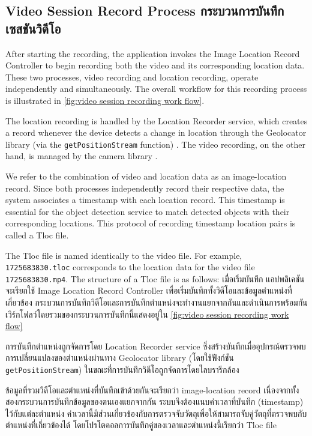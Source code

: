 \subsection{\ifenglish Video Session Record Process \else กระบวนการบันทึกเซสชันวิดีโอ \fi}

\ifenglish
After starting the recording, the application invokes the Image Location Record Controller to begin recording both the video and its corresponding location data. These two processes, video recording and location recording, operate independently and simultaneously. The overall workflow for this recording process is illustrated in \autoref{fig:video session recording work flow}. 

The location recording is handled by the Location Recorder service, which creates a record whenever the device detects a change in location through the Geolocator library (via the \texttt{getPositionStream} function) \cite{geolocator-doc}. The video recording, on the other hand, is managed by the camera library \cite{camera-doc}.

We refer to the combination of video and location data as an image-location record. Since both processes independently record their respective data, the system associates a timestamp with each location record. This timestamp is essential for the object detection service to match detected objects with their corresponding locations. This protocol of recording timestamp location pairs is called a Tloc file.

The Tloc file is named identically to the video file. For example, \texttt{1725683830.tloc} corresponds to the location data for the video file \texttt{1725683830.mp4}. The structure of a Tloc file is as follows:
\else
เมื่อเริ่มบันทึก แอปพลิเคชันจะเรียกใช้ Image Location Record Controller เพื่อเริ่มบันทึกทั้งวิดีโอและข้อมูลตำแหน่งที่เกี่ยวข้อง กระบวนการบันทึกวิดีโอและการบันทึกตำแหน่งจะทำงานแยกจากกันและดำเนินการพร้อมกัน เวิร์กโฟลว์โดยรวมของกระบวนการบันทึกนี้แสดงอยู่ใน \autoref{fig:video session recording work flow} 

การบันทึกตำแหน่งถูกจัดการโดย Location Recorder service ซึ่งสร้างบันทึกเมื่ออุปกรณ์ตรวจพบการเปลี่ยนแปลงของตำแหน่งผ่านทาง Geolocator library (โดยใช้ฟังก์ชัน \texttt{getPositionStream}) \cite{geolocator-doc} ในขณะที่การบันทึกวิดีโอถูกจัดการโดยไลบรารีกล้อง \cite{camera-doc}

ข้อมูลที่รวมวิดีโอและตำแหน่งที่บันทึกเข้าด้วยกันจะเรียกว่า image-location record เนื่องจากทั้งสองกระบวนการบันทึกข้อมูลของตนเองแยกจากกัน ระบบจึงต้องแนบค่าเวลาที่บันทึก (timestamp) ไว้กับแต่ละตำแหน่ง ค่าเวลานี้มีส่วนเกี่ยวข้องกับการตรวจจับวัตถุเพื่อให้สามารถจับคู่วัตถุที่ตรวจพบกับตำแหน่งที่เกี่ยวข้องได้ โดยโปรโตคอลการบันทึกคู่ของเวลาและตำแหน่งนี้เรียกว่า Tloc file

